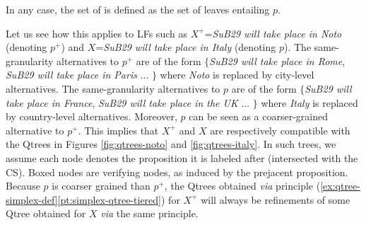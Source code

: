 \begin{exe}
{\begin{enumerate}[(i)]
		\end{enumerate}
		In any case, the set of  is defined as the set of leaves entailing $p$.
	}\label{ex:qtree-simplex-def}
\end{exe}

Let us see how this applies to LFs such as $X^+$=\textit{SuB29 will take place in Noto} (denoting $p^+$) and $X$=\textit{SuB29 will take place in Italy} (denoting $p$). The same-granularity alternatives to $p^+$ are of the form $\lbrace$\textit{SuB29 will take place in Rome}, \textit{SuB29 will take place in Paris} ... $\rbrace$ where \textit{Noto} is replaced by city-level alternatives. The same-granularity alternatives to $p$ are of the form $\lbrace$\textit{SuB29 will take place in France}, \textit{SuB29 will take place in the UK} ... $\rbrace$ where \textit{Italy} is replaced by country-level alternatives. Moreover, $p$ can be seen as a coarser-grained alternative to $p^+$. This implies that $X^+$ and $X$ are respectively compatible with the Qtrees in Figures \ref{fig:qtrees-noto} and \ref{fig:qtrees-italy}. In such trees, we assume each node denotes the proposition it is labeled after (intersected with the CS). Boxed nodes are verifying nodes, as induced by the prejacent proposition. Because $p$ is coarser grained than $p^+$, the Qtrees obtained \textit{via} principle (\ref{ex:qtree-simplex-def}\ref{pt:simplex-qtree-tiered}) for $X^+$ will always be refinements of some Qtree obtained for $X$ \textit{via} the same principle.

